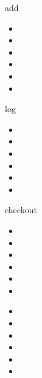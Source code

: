\documentclass[aspectratio=1610,20pt,xcolor=pdftex,dvipsnames,table,handout]{beamer}
\begin{document}
		\begin{frame} [t,plain]
			\begin{block} {add}
			\setlength{\leftmargini}{2em}			
			\begin{itemize}
				\item 
				\item 
				\item 
				\item 
				\item 
				\item 
			\end{itemize}
			\end{block}						
		\end{frame}			

		\begin{frame} [t,plain]
			\begin{block} {log}
			\setlength{\leftmargini}{2em}			
			\begin{itemize}
				\item 
				\item 
				\item 
				\item 
				\item 
				\item 
			\end{itemize}
			\end{block}						
		\end{frame}		

		\begin{frame} [t,plain]
			\begin{block} {checkout}
			\setlength{\leftmargini}{2em}			
			\begin{itemize}
				\item 
				\item 
				\item 
				\item 
				\item 
				\item 
			\end{itemize}
			\end{block}						
		\end{frame}			
	
		\begin{frame} [t,plain]
			\begin{block} {}
			\setlength{\leftmargini}{2em}			
			\begin{itemize}
				\item 
				\item 
				\item 
				\item 
				\item 
				\item 
			\end{itemize}
			\end{block}						
		\end{frame}			
\end{document}
